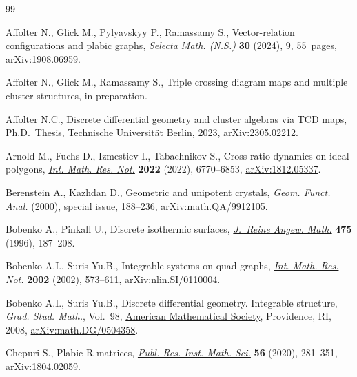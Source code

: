 \begin{thebibliography}{99}
\footnotesize\itemsep=0pt

Affolter N., Glick M., Pylyavskyy P., Ramassamy S., Vector-relation
 configurations and plabic graphs,
 \href{https://doi.org/10.1007/s00029-023-00898-z}{\textit{Selecta Math.
 (N.S.)}} \textbf{30} (2024), 9, 55~pages,
 \href{http://arxiv.org/abs/1908.06959}{arXiv:1908.06959}.

Affolter N., Glick M., Ramassamy S., Triple crossing diagram maps and multiple
 cluster structures, {i}n preparation.

Affolter N.C., Discrete differential geometry and cluster algebras via {TCD}
 maps, Ph.D.~Thesis, {T}echnische Universit\"at Berlin, 2023,
 \href{http://arxiv.org/abs/2305.02212}{arXiv:2305.02212}.

Arnold M., Fuchs D., Izmestiev I., Tabachnikov S., Cross-ratio dynamics on
 ideal polygons, \href{https://doi.org/10.1093/imrn/rnaa289}{\textit{Int.
 Math. Res. Not.}} \textbf{2022} (2022), 6770--6853,
 \href{http://arxiv.org/abs/1812.05337}{arXiv:1812.05337}.

Berenstein A., Kazhdan D., Geometric and unipotent crystals,
 \href{https://doi.org/10.1007/978-3-0346-0422-2_8}{\textit{Geom. Funct.
 Anal.}} (2000), special issue, 188--236,
 \href{http://arxiv.org/abs/math.QA/9912105}{arXiv:math.QA/9912105}.

Bobenko A., Pinkall U., Discrete isothermic surfaces,
 \href{https://doi.org/10.1515/crll.1996.475.187}{\textit{J.~Reine Angew.
 Math.}} \textbf{475} (1996), 187--208.

Bobenko A.I., Suris Yu.B., Integrable systems on quad-graphs,
 \href{https://doi.org/10.1155/S1073792802110075}{\textit{Int. Math. Res.
 Not.}} \textbf{2002} (2002), 573--611,
 \href{http://arxiv.org/abs/nlin.SI/0110004}{arXiv:nlin.SI/0110004}.

Bobenko A.I., Suris Yu.B., Discrete differential geometry. Integrable structure,
 \textit{Grad. Stud. Math.}, Vol.~98,
 \href{https://doi.org/10.1090/gsm/098}{American Mathematical Society},
 Providence, RI, 2008,
 \href{http://arxiv.org/abs/math.DG/0504358}{arXiv:math.DG/0504358}.

Chepuri S., Plabic {R}-matrices,
 \href{https://doi.org/10.4171/prims/56-2-2}{\textit{Publ. Res. Inst. Math.
 Sci.}} \textbf{56} (2020), 281--351,
 \href{http://arxiv.org/abs/1804.02059}{arXiv:1804.02059}.


\end{thebibliography}
